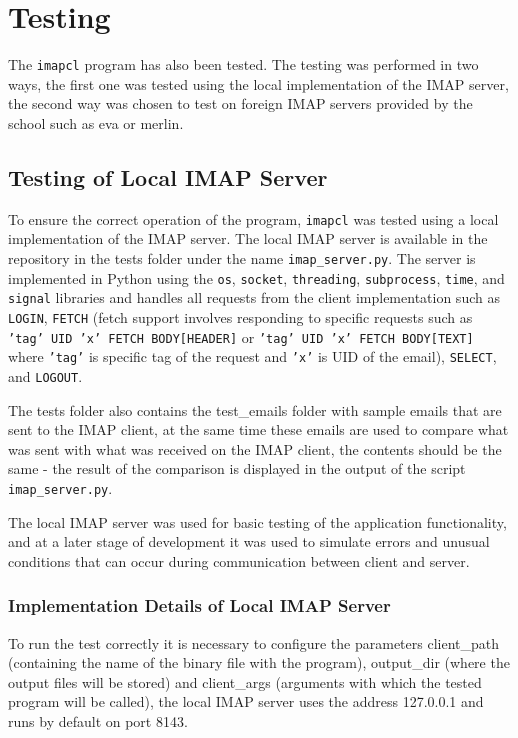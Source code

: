 \documentclass[a4paper,11pt]{article}
\begin{document}
\section{Testing}
The \verb!imapcl! program has also been tested. The testing was performed in two ways, 
the first one was tested using the local implementation of the IMAP server, the second 
way was chosen to test on foreign IMAP servers provided by the school such as eva or merlin.

\newpage

\subsection{Testing of Local IMAP Server}
To ensure the correct operation of the program, \texttt{imapcl} was tested using a local 
implementation of the IMAP server. The local IMAP server is available in the repository 
in the tests folder under the name \texttt{imap\_server.py}. The server is implemented in Python 
using the \texttt{os}, \texttt{socket}, \texttt{threading}, \texttt{subprocess}, 
\texttt{time}, and \texttt{signal} libraries and handles all requests from the client 
implementation such as \texttt{LOGIN}, \texttt{FETCH} (fetch support involves responding to 
specific requests such as \texttt{'tag' UID 'x' FETCH BODY[HEADER]} or \texttt{'tag' UID 'x' FETCH BODY[TEXT]} 
where \texttt{'tag'} is specific tag of the request and \texttt{'x'} is UID of the email), 
\texttt{SELECT}, and \texttt{LOGOUT}.

The tests folder also contains the test\_emails folder with sample emails that are sent to 
the IMAP client, at the same time these emails are used to compare what was sent with what 
was received on the IMAP client, the contents should be the same - the result of the 
comparison is displayed in the output of the script \texttt{imap\_server.py}.

The local IMAP server was used for basic testing of the application functionality, 
and at a later stage of development it was used to simulate errors and unusual conditions 
that can occur during communication between client and server.

\subsubsection{Implementation Details of Local IMAP Server}
To run the test correctly it is necessary to configure the parameters client\_path (containing the name of the binary file with the program), 
output\_dir (where the output files will be stored) and client\_args (arguments with which the tested program will be called), 
the local IMAP server uses the address 127.0.0.1 and runs by default on port 8143.
\end{document}

